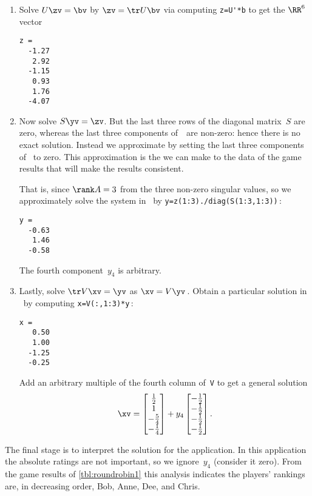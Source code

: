 \begin{example}
\begin{solution}
\begin{enumerate}
\item Solve \(U\zv=\bv\) by  \(\zv=\tr U\bv\) via computing \verb|z=U'*b| to get the \(\RR^6\) vector
\begin{verbatim}
z =
  -1.27
   2.92
  -1.15
   0.93
   1.76
  -4.07
\end{verbatim}

\item Now solve \(S\yv=\zv\).
But the last three rows of the diagonal matrix~\(S\) are zero, whereas the last three components of~\zv\ are non-zero: hence there is no exact solution. 
Instead we approximate by setting the last three components of \zv\ to zero.
This approximation is the \emph{} we can make to the data of the game results that will make the results consistent.

That is, since \(\rank A=3\) from the three non-zero singular values, so we approximately solve the system in \script\ by \verb|y=z(1:3)./diag(S(1:3,1:3))|\,:
\begin{verbatim}
y =
  -0.63
   1.46
  -0.58
\end{verbatim}
The fourth component~\(y_4\) is arbitrary.

\item Lastly, solve \(\tr V\xv=\yv\) as \(\xv=V\yv\)\,. 
Obtain a particular solution in \script\ by computing \verb|x=V(:,1:3)*y|\,:
\begin{verbatim}
x =
   0.50
   1.00
  -1.25
  -0.25
\end{verbatim}
Add an arbitrary multiple of the fourth column of~\verb|V| to get a general solution
\begin{equation*}
\xv=\begin{bmatrix} \frac12\\1\\-\frac54\\-\frac14 \end{bmatrix}
+y_4\begin{bmatrix} -\frac12\\ -\frac12\\ -\frac12\\ -\frac12 \end{bmatrix}.
\end{equation*}
\end{enumerate}
The final stage is to interpret the solution for the application.
In this application the absolute ratings are not important, so we ignore~\(y_4\) (consider it zero).  
From the game results of \autoref{tbl:roundrobin1} this analysis indicates the players' rankings are, in decreasing order, Bob, Anne, Dee, and Chris.
\end{solution}
\end{example}




